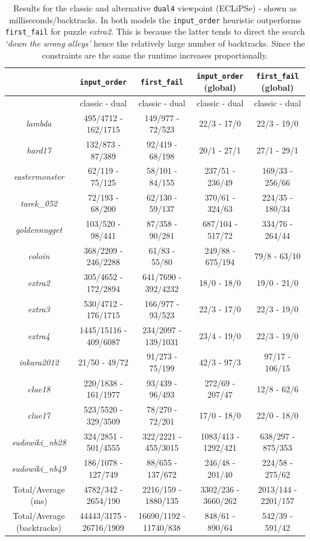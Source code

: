 \begin{table}[H]
\footnotesize
\bgroup
\def\arraystretch{1.3}
\begin{tabular}{ccc|cc}
\multicolumn{1}{l}{}    & \texttt{input\_order} & \texttt{first\_fail} & \texttt{input\_order} (global) & \texttt{first\_fail} (global) \\ \hline
& classic - dual & classic - dual & classic - dual & classic - dual \\
\textit{lambda} & 495/4712 - 162/1715 &  149/977 - 72/523 &  22/3 - 17/0 & 22/3 - 19/0 \\
\textit{hard17} & 132/873 - 87/389 & 92/419  - 68/198 &  20/1 - 27/1 & 27/1 - 29/1 \\
\textit{eastermonster}  & 62/119 - 75/125 & 58/101 - 84/155 &  237/51 - 236/49 & 169/33 - 256/66  \\
\textit{tarek\_052}  & 72/193 - 68/200 & 62/130 - 59/137 &  370/61 - 324/63 & 224/35 - 180/34  \\
\textit{goldennugget} & 103/520 - 98/441 & 87/358 - 90/281 &  687/104 - 517/72 & 334/76 - 264/44  \\
\textit{coloin} & 368/2209 - 246/2288 & 61/83 - 55/80 &  249/88 - 675/194 & 79/8 - 63/10  \\
\textit{extra2} & 305/4652 - 172/2894 & 641/7690 - 392/4232 &  18/0 - 18/0 & 19/0 - 21/0  \\
\textit{extra3} & 530/4712 - 176/1715 & 166/977 - 93/523 &  22/3 - 17/0 & 22/3 - 19/0   \\
\textit{extra4} & 1445/15116 - 409/6087 & 234/2097 - 139/1031 &  23/4 - 19/0 & 22/3 - 19/0  \\
\textit{inkara2012} & 21/50 - 49/72 & 91/273 - 75/199 &  42/3 - 97/3 & 97/17 - 106/15  \\
\textit{clue18} & 220/1838 - 161/1977 & 93/439 - 96/493 &  272/69 - 207/47 & 12/8 - 62/6  \\
\textit{clue17} & 523/5520 - 329/3509 & 78/270 - 72/201 &  17/0 - 18/0 & 22/0 - 18/0  \\
\textit{sudowiki\_nb28} & 324/2851 - 501/4555 & 322/2221 - 455/3015 & 1083/413 - 1292/421 & 638/297 - 875/353  \\
\textit{sudowiki\_nb49} & 186/1078 - 127/749 & 88/655 - 137/672 & 246/48 - 201/40 & 224/58 - 275/62  \\\hline
Total/Average (ms) & 4782/342 - 2654/190 & 2216/159 - 1880/135 & 3302/236 - 3660/262 & 2013/144 - 2201/157   \\
Total/Average (backtracks) & 44443/3175 - 26716/1909 & 16690/1192 - 11740/838 & 848/61 - 890/64 & 542/39 - 591/42                          
\end{tabular}
\egroup
\caption{Results for the classic and alternative \texttt{dual4} viewpoint (ECLiPSe) - shown as milliseconds/backtracks. In both models the \texttt{input\_order} heuristic outperforms \texttt{first\_fail} for puzzle \textit{extra2}. This is because the latter tends to direct the search \textit{`down the wrong alleys'} hence the relatively large number of backtracks. Since the constraints are the same the runtime increases proportionally.}
\label{tab:res2}
\end{table}

